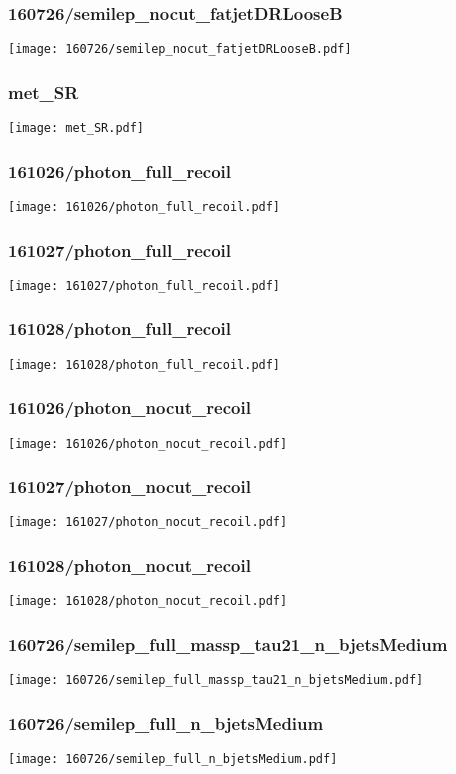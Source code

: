 \begin{frame}
   \frametitle{\small 160726/semilep\_nocut\_fatjetDRLooseB}
   \centering
   \texttt{[image: 160726/semilep\_nocut\_fatjetDRLooseB.pdf]}
\end{frame}

\begin{frame}
   \frametitle{\small met\_SR}
   \centering
   \texttt{[image: met\_SR.pdf]}
\end{frame}

\begin{frame}
   \frametitle{\small 161026/photon\_full\_recoil}
   \centering
   \texttt{[image: 161026/photon\_full\_recoil.pdf]}
\end{frame}

\begin{frame}
   \frametitle{\small 161027/photon\_full\_recoil}
   \centering
   \texttt{[image: 161027/photon\_full\_recoil.pdf]}
\end{frame}

\begin{frame}
   \frametitle{\small 161028/photon\_full\_recoil}
   \centering
   \texttt{[image: 161028/photon\_full\_recoil.pdf]}
\end{frame}

\begin{frame}
   \frametitle{\small 161026/photon\_nocut\_recoil}
   \centering
   \texttt{[image: 161026/photon\_nocut\_recoil.pdf]}
\end{frame}

\begin{frame}
   \frametitle{\small 161027/photon\_nocut\_recoil}
   \centering
   \texttt{[image: 161027/photon\_nocut\_recoil.pdf]}
\end{frame}

\begin{frame}
   \frametitle{\small 161028/photon\_nocut\_recoil}
   \centering
   \texttt{[image: 161028/photon\_nocut\_recoil.pdf]}
\end{frame}

\begin{frame}
   \frametitle{\small 160726/semilep\_full\_massp\_tau21\_n\_bjetsMedium}
   \centering
   \texttt{[image: 160726/semilep\_full\_massp\_tau21\_n\_bjetsMedium.pdf]}
\end{frame}

\begin{frame}
   \frametitle{\small 160726/semilep\_full\_n\_bjetsMedium}
   \centering
   \texttt{[image: 160726/semilep\_full\_n\_bjetsMedium.pdf]}
\end{frame}

